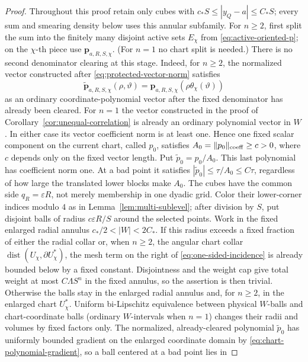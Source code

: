 \documentclass[11pt]{article}
\numberwithin{equation}{section}
\theoremstyle{remark}
\theoremstyle{definition}
\newcommand{\norm}[1]{\lVert #1\rVert}
\begin{document}
\begin{proof}
Throughout this proof retain only cubes with
$c_*S\le|y_Q-a|\le C_*S$; every sum and smearing density below uses
this annular subfamily.
For \(n\ge2\), first split the sum into the finitely many disjoint active
sets \(E_\chi\) from \eqref{eq:active-oriented-p}; on the \(\chi\)-th
piece use \(\mathbf p_{a,R,S,\chi}\).  (For \(n=1\) no chart split is
needed.)  There is no second denominator clearing at this stage.  Indeed,
for $n\ge2$, the normalized vector constructed after
\eqref{eq:protected-vector-norm} satisfies
\[
 \widetilde{\mathbf p}_{a,R,S,\chi}(\rho,\vartheta)
 =\mathbf p_{a,R,S,\chi}(\rho\theta_\chi(\vartheta))
\]
as an ordinary coordinate-polynomial vector after the fixed denominator
has already been cleared.  For $n=1$ the vector constructed in the proof
of Corollary~\ref{cor:unequal-correlation} is already an ordinary
polynomial vector in $W$.  In either case its vector coefficient norm is
at least one.  Hence one fixed scalar component on the current chart,
called $p_0$, satisfies
$A_0=\norm{p_0}_{\rm coeff}\ge c>0$, where $c$ depends only on the fixed
vector length.  Put
\(\widetilde p_0=p_0/A_0\).  This last polynomial
has coefficient norm one.  At a bad point it satisfies
\(|\widetilde p_0|\le\tau/A_0\le C\tau\), regardless of how large the
translated lower blocks make \(A_0\).  The cubes have the common side
$q_R=\varepsilon R$, not merely membership in one dyadic grid.
Color their lower-corner indices modulo $4$ as in
Lemma~\ref{lem:multi-sublevel}; after division by $S$, put disjoint balls
of radius $c\varepsilon R/S$ around the selected points.  Work in the fixed enlarged
radial annulus $c_*/2<|W|<2C_*$.  If this radius exceeds a fixed fraction
of either the radial collar or, when $n\ge2$, the angular chart collar
$\operatorname{dist}(U_\chi,\partial U_\chi^*)$,
the mesh term on the right of \eqref{eq:one-sided-incidence} is already
bounded below by a fixed constant.  Disjointness and the weight cap give
total weight at most $C\Lambda S^n$ in the fixed annulus, so the assertion
is then trivial.  Otherwise
the balls stay in the enlarged radial annulus and, for $n\ge2$, in the
enlarged chart $U_\chi^*$.  Uniform bi-Lipschitz
equivalence between physical \(W\)-balls and chart-coordinate balls
(ordinary \(W\)-intervals when $n=1$) changes their radii and volumes by
fixed factors only.  The normalized, already-cleared polynomial
\(\widetilde p_0\) has uniformly bounded gradient on the enlarged
coordinate domain by \eqref{eq:chart-polynomial-gradient},
so a ball centered at a bad point lies in

\end{proof}
\end{document}
